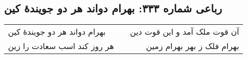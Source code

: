 \begin{center}
\section*{رباعی شماره ۳۳۳: بهرام دواند هر دو جویندهٔ کین}
\label{sec:sh333}
\begin{longtable}{l p{0.5cm} r}
بهرام دواند هر دو جویندهٔ کین
&&
آن قوت ملک آمد و این قوت دین
\\
هر روز کند اسب سعادت را زین
&&
بهرام فلک ز بهر بهرام زمین
\\
\end{longtable}
\end{center}
